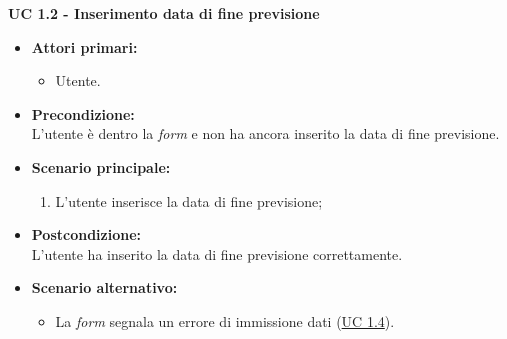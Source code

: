 \noindent \textbf{\large UC 1.2 - Inserimento data di fine previsione}
\label{uc:inserimento-data-fine-prev}
\begin{itemize}

	\item \textbf{Attori primari: }
		\begin{itemize}
			\item Utente.
		\end{itemize}

	\item \textbf{Precondizione: }\\[0.3cm]
		L'utente è dentro la \textit{form} e non ha ancora inserito la data di fine previsione.

	\item \textbf{Scenario principale: }
		\begin{enumerate}
			\item L'utente inserisce la data di fine previsione;
		\end{enumerate}

	\item \textbf{Postcondizione: }\\[0.3cm]
		L'utente ha inserito la data di fine previsione correttamente.

	\item \textbf{Scenario alternativo: }
		\begin{itemize}
		    \item La \textit{form} segnala un errore di immissione dati (\hyperref[uc:err-inserimento-data-fine-prev]{UC 1.4}).
		\end{itemize}

\end{itemize}

\vspace{0.4cm}

